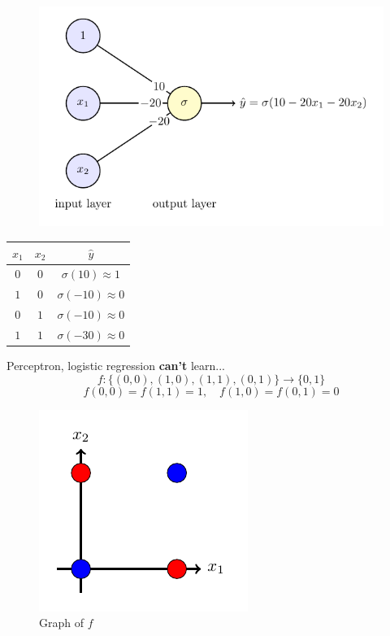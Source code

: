 \documentclass{beamer}
\begin{document}
\begin{frame}{}
    \begin{figure}
        \includegraphics[scale=0.8]{one_and_three_nn/one_and_three_nn.pdf}
    \end{figure}

    \begin{center}
        \begin{tabular}{cc|c}
            $x_1$ & $x_2$ & $\widehat{y}$\\\hline
            $0$ & $0$ & $\sigma(10) \approx 1$\\
            $1$ & $0$ & $\sigma(-10) \approx 0$\\
            $0$ & $1$ & $\sigma(-10) \approx 0$\\
            $1$ & $1$ & $\sigma(-30) \approx 0$
        \end{tabular}
    \end{center}
\end{frame}

\begin{frame}{}
    Perceptron, logistic regression \textbf{can't} learn...
    \[
        f:\big\{(0, 0), (1, 0), (1, 1), (0, 1)\big\}\longrightarrow
        \{0,1\}
    \]
    \[
        f(0, 0) = f(1, 1) = 1,\quad f(1, 0) = f(0, 1) = 0
    \]

    \begin{figure}
        \includegraphics[]{two_and_two/two_and_two.pdf}
        \caption{Graph of $f$}
    \end{figure}
\end{frame}
\end{document}
